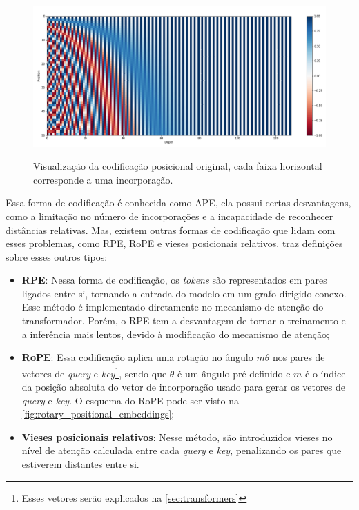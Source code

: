 \begin{figure}[ht]
      \centering
      \caption{\small Visualização da codificação posicional original, cada faixa horizontal corresponde a uma incorporação.}
      \includegraphics[width=1.0\columnwidth,keepaspectratio]{images/absolute_positional_embeddings.png}
      \label{fig:absolute_positional_embeddings}
\end{figure}

Essa forma de codificação é conhecida como \ac{APE}, ela possui certas desvantagens, como a limitação no número de incorporações e a incapacidade de reconhecer
distâncias relativas. Mas, existem outras formas de codificação que lidam com esses problemas, como \ac{RPE}, \acl{RoPE} e vieses posicionais relativos.
\textcite{llm_survey_2024} traz definições sobre esses outros tipos:

\begin{itemize}
      \item \textbf{\ac{RPE}}: Nessa forma de codificação, os \textit{tokens} são representados em pares ligados entre si, tornando a entrada do modelo em um grafo
            dirigido conexo. Esse método é implementado diretamente no mecanismo de atenção do transformador. Porém, o \ac{RPE} tem a desvantagem de tornar o treinamento
            e a inferência mais lentos, devido à modificação do mecanismo de atenção;
      \item \textbf{\ac{RoPE}}: Essa codificação aplica uma rotação no ângulo \begin{math}m\theta\end{math} nos pares de vetores de
            \textit{query} e \textit{key}\footnote{Esses vetores serão explicados na \autoref{sec:transformers}}, sendo que \begin{math}\theta\end{math} é um ângulo
            pré-definido e \begin{math}m\end{math} é o índice da posição absoluta do vetor de incorporação usado para gerar os vetores de \textit{query} e \textit{key}. O
            esquema do \ac{RoPE} pode ser visto na \autoref{fig:rotary_positional_embeddings};
      \item \textbf{Vieses posicionais relativos}: Nesse método, são introduzidos vieses no nível de atenção calculada entre cada \textit{query} e \textit{key},
            penalizando os pares que estiverem distantes entre si.
\end{itemize}

